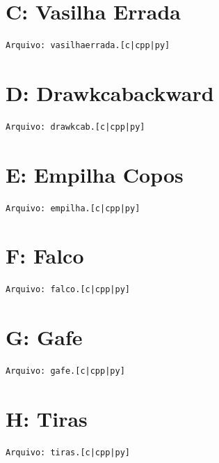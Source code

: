 \documentclass[12pt,oneside]{article} %
\begin{document}
\newpage
\section*{C: Vasilha Errada} %
\vspace{-0.52cm}
\noindent \begin{verbatim}Arquivo: vasilhaerrada.[c|cpp|py]\end{verbatim}


\newpage
\section*{D: Drawkcabackward} %
\vspace{-0.52cm}
\noindent \begin{verbatim}Arquivo: drawkcab.[c|cpp|py]\end{verbatim}


\newpage
\section*{E: Empilha Copos} %
\vspace{-0.52cm}
\noindent \begin{verbatim}Arquivo: empilha.[c|cpp|py]\end{verbatim}


\newpage
\section*{F: Falco} %
\vspace{-0.52cm}
\noindent \begin{verbatim}Arquivo: falco.[c|cpp|py]\end{verbatim}


\newpage
\section*{G: Gafe} %
\vspace{-0.52cm}
\noindent \begin{verbatim}Arquivo: gafe.[c|cpp|py]\end{verbatim}


\newpage
\section*{H: Tiras} %
\vspace{-0.52cm}
\noindent \begin{verbatim}Arquivo: tiras.[c|cpp|py]\end{verbatim}

\end{document}
